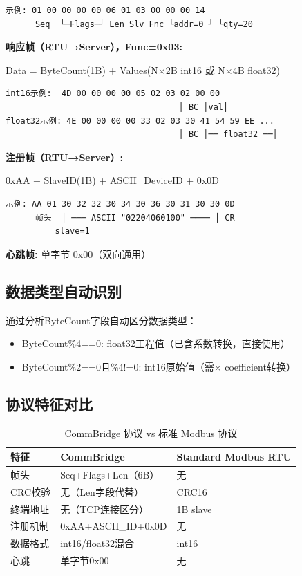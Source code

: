 \documentclass[12pt,a4paper]{ctexart}
\begin{document}
\begin{lstlisting}
示例: 01 00 00 00 00 06 01 03 00 00 00 14
      Seq  └─Flags─┘ Len Slv Fnc └addr=0 ┘ └qty=20
\end{lstlisting}

\textbf{响应帧（RTU→Server），Func=0x03:}

Data = ByteCount(1B) + Values(N$\times$2B int16 或 N$\times$4B float32)

\begin{lstlisting}
int16示例:  4D 00 00 00 00 05 02 03 02 00 00
                                   │ BC │val│
float32示例: 4E 00 00 00 00 33 02 03 30 41 54 59 EE ...
                                   │ BC │── float32 ──│
\end{lstlisting}

\textbf{注册帧（RTU→Server）:}

0xAA + SlaveID(1B) + ASCII\_DeviceID + 0x0D

\begin{lstlisting}
示例: AA 01 30 32 32 30 34 30 36 30 31 30 30 0D
      帧头  │ ─── ASCII "02204060100" ──── │ CR
          slave=1
\end{lstlisting}

\textbf{心跳帧:} 单字节 0x00（双向通用）

\subsection{数据类型自动识别}

通过分析ByteCount字段自动区分数据类型：

\begin{itemize}[leftmargin=*]
  \item ByteCount\%4==0: float32工程值（已含系数转换，直接使用）
  \item ByteCount\%2==0且\%4!=0: int16原始值（需$\times$ coefficient转换）
\end{itemize}

\subsection{协议特征对比}

\begin{table}[H]\centering
\caption{CommBridge 协议 vs 标准 Modbus 协议}
\begin{tabular}{p{3.5cm}p{3.5cm}p{3.5cm}}
\toprule
\textbf{特征} & \textbf{CommBridge} & \textbf{Standard Modbus RTU} \\
\midrule
帧头 & Seq+Flags+Len（6B） & 无 \\
CRC校验 & 无（Len字段代替） & CRC16 \\
终端地址 & 无（TCP连接区分） & 1B slave \\
注册机制 & 0xAA+ASCII\_ID+0x0D & 无 \\
数据格式 & int16/float32混合 & int16 \\
心跳 & 单字节0x00 & 无 \\
\bottomrule
\end{tabular}
\end{table}
\end{document}
